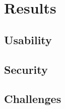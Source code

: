 
\section{Results}
\label{sec:results}


\subsection{Usability}
\label{subsec:usability}



\subsection{Security}
\label{subsec:security}



\subsection{Challenges}
\label{subsec:challenges}

